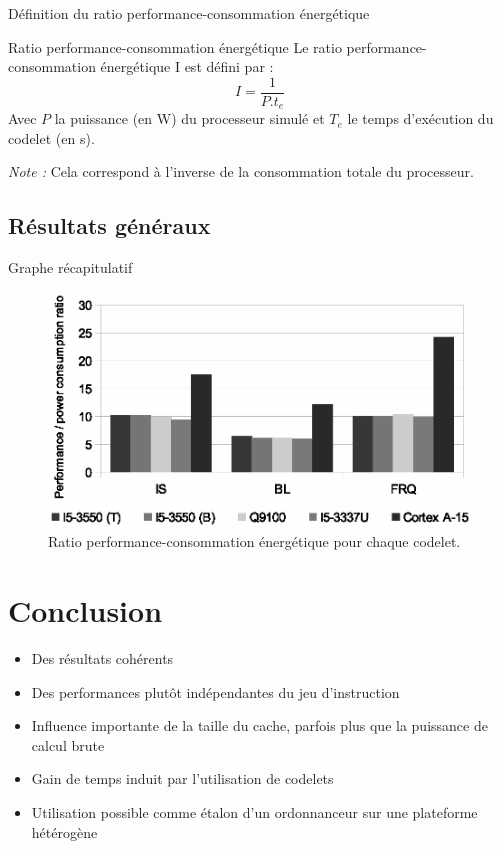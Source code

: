 \documentclass{beamer}
\begin{document}
\begin{frame}{Définition du ratio performance-consommation énergétique}
\begin{block}{Ratio performance-consommation énergétique}
Le ratio performance-consommation énergétique I est défini par :
\begin{equation*}
I=\frac{1}{P.t_e}
\end{equation*}
Avec $P$ la puissance (en W) du processeur simulé et $T_e$ le temps d'exécution du codelet (en s).
\end{block}
\textit{Note :} Cela correspond à l'inverse de la consommation totale du processeur.
\end{frame}

\subsection{Résultats généraux}

\begin{frame}{Graphe récapitulatif}
\begin{figure}
\centering
\includegraphics[width=0.65\paperwidth]{Ratio.eps}
\caption{\label{Ratio}Ratio performance-consommation énergétique pour chaque codelet.}
\end{figure}

\end{frame}

\section{Conclusion}
\begin{frame}
\begin{itemize}
\item Des résultats cohérents
\bigskip
\item Des performances plutôt indépendantes du jeu d'instruction
\bigskip
\item Influence importante de la taille du cache, parfois plus que la puissance de calcul brute
\bigskip
\item Gain de temps induit par l'utilisation de codelets
\bigskip
\item Utilisation possible comme étalon d'un ordonnanceur sur une plateforme hétérogène
\end{itemize}
\end{frame}
\end{document}
